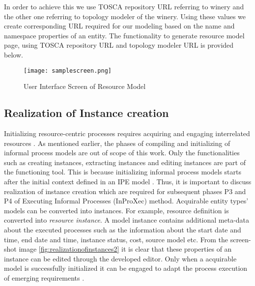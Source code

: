 In order to achieve this we use TOSCA repository URL referring to winery and the other one referring to topology modeler of the winery. Using these values we create corresponding URL required for our modeling based on the name and namespace properties of an entity. The functionality to generate resource model page, using TOSCA repository URL and topology modeler URL is provided below.

			
			
\begin{figure}
	\centering
	\texttt{[image: samplescreen.png]}
	\caption{User Interface Screen of Resource Model}
	\label{fig:realizationofresourcemodel}
\end{figure}



		
\subsection{Realization of Instance creation}
Initializing resource-centric processes requires acquiring and engaging interrelated resources \cite{Sungur2015}. As mentioned earlier, the phases of compiling and initializing of informal process models are out of scope of this work. Only the functionalities such as creating instances, extracting instances and editing instances are part of the functioning tool. This is because initializing informal process models starts after the initial context defined in an IPE model \cite{Sungur2015}. Thus, it is important to discuss realization of instance creation which are required for subsequent phases P3 and P4 of Executing Informal Processes (InProXec) method. Acquirable entity types' models can be converted into instances. For example, resource definition is converted into \textit{resource instance}. A model instance contains additional meta-data about the executed processes such as the information about the start date and time, end date and time, instance status, cost, source model etc. From the screen-shot image \ref{fig:realizationofinstances2} it is clear that these properties of an instance can be edited through the developed editor. Only when a acquirable model is successfully initialized it can be engaged to adapt the process execution of emerging requirements \cite{Sungur2015}. 


